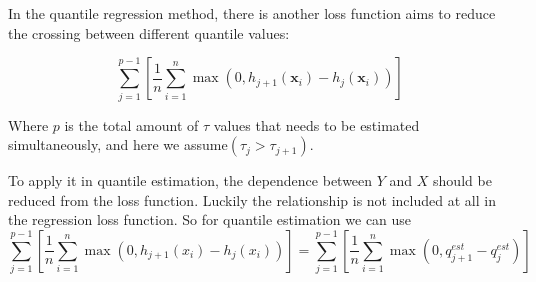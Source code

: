 In the quantile regression method, there is another loss function aims to reduce the crossing between different quantile values:

\begin{equation}
    \sum_{j=1}^{p-1}\left[\frac{1}{n} \sum_{i=1}^{n} \max \left(0, h_{j+1}\left(\mathbf{x}_{i}\right)-h_{j}\left(\mathbf{x}_{i}\right)\right)\right]
\end{equation}


Where $p$ is the total amount of $\tau$ values that needs to be estimated simultaneously, and here we assume$(\tau_j > \tau_{j+1})$.


To apply it in quantile estimation, the dependence between $Y$ and $X$ should be reduced from the loss function. Luckily the relationship is not included at all in the regression loss function. So for quantile estimation we can use
\begin{equation}
    \sum_{j=1}^{p-1}\left[\frac{1}{n} \sum_{i=1}^{n} \max \left(0, h_{j+1}\left({x}_{i}\right)-h_{j}\left({x}_{i}\right)\right)\right]
= \sum_{j=1}^{p-1}\left[\frac{1}{n} \sum_{i=1}^{n} \max \left(0, q_{j+1}^{est}-q_{j}^{est}\right)\right]
\end{equation}


